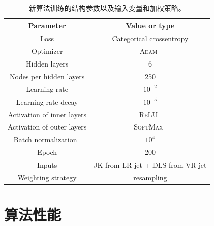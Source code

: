 \begin{table}[ht]
\caption{
新算法训练的结构参数以及输入变量和加权策略。
}
\begin{center}
\begin{tabular}{c|c}
    \hline
    \hline
    Parameter & Value or type  \\
    \hline  
    Loss & Categorical crossentropy \\
     \hline  
    Optimizer & \textsc{Adam}~\cite{Kingma:2014} \\
    \hline  
    Hidden layers & 6 \\
    \hline  
    Nodes per hidden layers & 250 \\
    \hline  
    Learning rate & $10^{-2}$\\
    \hline  
    Learning rate decay & $10^{-5}$ \\
    \hline  
    Activation of inner layers & \textsc{ReLU}~\cite{Glorot:2011} \\
    \hline  
    Activation of outer layers & \textsc{SoftMax}~\cite{MLMIT} \\
    \hline  
    Batch normalization~\cite{Ioffe:2015} & $10^{4}$ \\
    \hline  
    Epoch & 200 \\
    \hline  
    Inputs & JK from LR-jet + DLS from VR-jet \\
    \hline  
    Weighting strategy & resampling \\
    \hline
    \hline
\end{tabular}
\end{center}
\label{tab:Final}
\end{table}


\section{算法性能}
\label{sec:XbbPerf}


